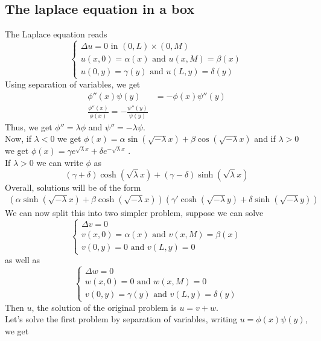 \documentclass[../main.tex]{subfiles}
\begin{document}
\subsection{The laplace equation in a box}
The Laplace equation reads
\[ 
\begin{cases}
\Delta u = 0 \text{ in  } ( 0,L) \times ( 0,M) \\
u( x,0) = \alpha( x)  \text{ and } u( x,M) = \beta( x) \\
u( 0,y) = \gamma( y) \text{ and  } u( L,y) =  \delta( y) 
\end{cases}
\]
Using separation of variables, we get
\begin{align*}
	\phi''( x) \psi( y) &= - \phi( x) \psi''( y) \\
	\frac{\phi''( x) }{\phi( x) }= - \frac{\psi''( y) }{\psi( y) }
\end{align*}
Thus, we get $ \phi''= \lambda\phi$ and $ \psi'' = - \lambda \psi$.\\
Now, if $ \lambda< 0$ we get $ \phi( x) = \alpha \sin( \sqrt{ - \lambda} x) + \beta \cos(  \sqrt{- \lambda} x) $ and if $ \lambda > 0$ we get $ \phi( x) = \gamma e^{ \sqrt{\lambda} x} + \delta e^{ - \sqrt{ \lambda} x} $ .\\
If $ \lambda>0$ we can write $\phi$ as
\[ 
	( \gamma+ \delta)  \cosh (  \sqrt{\lambda} x) + ( \gamma- \delta) \sinh ( \sqrt{ \lambda} x) 
\]
Overall, solutions will be of the form 
\begin{align*}
\left( \alpha \sinh(  \sqrt{- \lambda} x) + \beta \cosh (  \sqrt{- \lambda} x) \right) \left(  \gamma' \cosh (  \sqrt{- \lambda } y) + \delta \sinh(  \sqrt{ - \lambda } y) \right) 
\end{align*}
We can now split this into two simpler problem, suppose we can solve
\[ 
\begin{cases}
\Delta v = 0 \\
v( x,0) = \alpha( x) \text{ and } v( x,M) = \beta( x) \\
v( 0, y) =0 \text{ and } v( L,y) = 0
\end{cases}
\]
as well as
\[ 
\begin{cases}
\Delta w = 0\\
w( x,0) = 0 \text{ and } w( x,M) = 0 \\
v( 0, y) = \gamma( y)  \text{ and } v( L,y) = \delta( y) 
\end{cases}
\]
Then $u$, the solution of the original problem is $u = v+w$.\\
Let's solve the first problem by separation of variables, writing $u = \phi( x) \psi( y) $, we get
\end{document}
